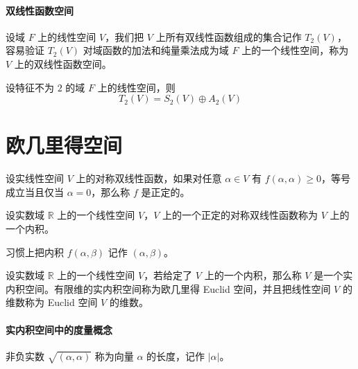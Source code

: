 \paragraph{双线性函数空间}

\begin{definition}
	设域 $F$ 上的线性空间 $V$，我们把 $V$ 上所有双线性函数组成的集合记作 $T_2(V)$，容易验证 $T_2(V)$ 对域函数的加法和纯量乘法成为域 $F$ 上的一个线性空间，称为 $V$ 上的双线性函数空间。
\end{definition}

\begin{theorem}
	设特征不为 $2$ 的域 $F$ 上的线性空间，则
	\[ T_2(V) = S_2(V) \oplus A_2(V) \]
\end{theorem}



\section{欧几里得空间}

\begin{definition}[正定的]
	设实线性空间 $V$ 上的对称双线性函数，如果对任意 $\alpha \in V$ 有 $f(\alpha,\alpha) \geqslant 0$，等号成立当且仅当 $\alpha = 0$，那么称 $f$ 是正定的。
\end{definition}

\begin{definition}[内积] 
	设实数域 $\mathbb{R}$ 上的一个线性空间 $V$，$V$ 上的一个正定的对称双线性函数称为 $V$ 上的一个内积。
\end{definition}

习惯上把内积 $f(\alpha,\beta)$ 记作 $(\alpha,\beta)$。

\begin{definition}
	设实数域 $\mathbb{R}$ 上的一个线性空间 $V$，若给定了 $V$ 上的一个内积，那么称 $V$ 是一个实内积空间。有限维的实内积空间称为欧几里得 Euclid 空间，并且把线性空间 $V$ 的维数称为 Euclid 空间 $V$ 的维数。
\end{definition}

\paragraph{实内积空间中的度量概念}

\begin{definition}
	非负实数 $\sqrt{(\alpha,\alpha)}$ 称为向量 $\alpha$ 的长度，记作 $|\alpha|$。
\end{definition}

